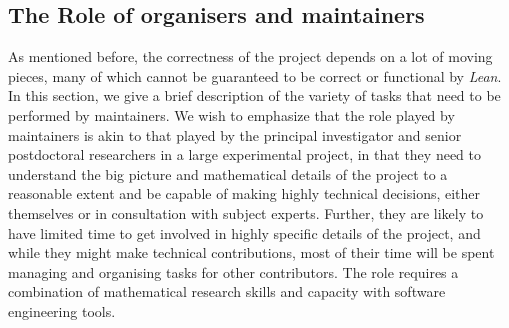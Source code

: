 \subsection{The Role of organisers and maintainers}
As mentioned before, the correctness of the project depends on a lot of moving pieces, many of which cannot be guaranteed to be correct or functional by \emph{Lean}. In this section, we give a brief description of the variety of tasks that need to be performed by maintainers. We wish to emphasize that the role played by maintainers is akin to that played by the principal investigator and senior postdoctoral researchers in a large experimental project, in that they need to understand the big picture and mathematical details of the project to a reasonable extent and be capable of making highly technical decisions, either themselves or in consultation with subject experts. Further, they are likely to have limited time to get involved in highly specific details of the project, and while they might make technical contributions, most of their time will be spent managing and organising tasks for other contributors. The role requires a combination of mathematical research skills and capacity with software engineering tools.

